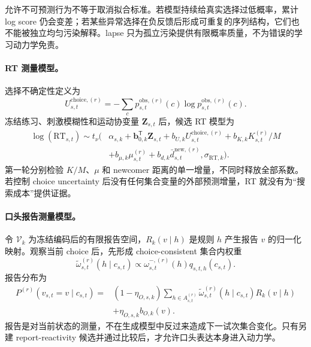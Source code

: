 允许不可预测行为不等于取消拟合标准。若模型持续给真实选择过低概率，累计 log score 仍会变差；若某些异常选择在负反馈后形成可重复的序列结构，它们也不能被独立均匀污染解释。lapse 只为孤立污染提供有限概率质量，不为错误的学习动力学免责。

\paragraph{RT 测量模型。}
选择不确定性定义为
\begin{equation}
    U^{\mathrm{choice},(r)}_{s,t}
    =-\sum_c p^{\mathrm{obs},(r)}_{s,t}(c)
      \log p^{\mathrm{obs},(r)}_{s,t}(c).
\end{equation}
冻结练习、刺激模糊性和运动协变量 $\mathbf Z_{s,t}$ 后，候选 RT 模型为
\begin{align}
    \log(\mathrm{RT}_{s,t})\sim t_\nu\!\Big(&
      \alpha_{s,k}+\mathbf b_{0,k}^{\mathsf T}\mathbf Z_{s,t}
      +b_{U,k}U^{\mathrm{choice},(r)}_{s,t}
      +b_{K,k}K^{(r)}_{s,t}/M\nonumber\\
      &+b_{\mu,k}\mu^{(r)}_{s,t}
      +b_{d,k}\bar d^{\mathrm{new},(r)}_{s,t},
      \sigma_{\mathrm{RT},k}\Big).
    \label{eq:model0805-rt-channel}
\end{align}
第一轮分别检验 $K/M$、$\mu$ 和 newcomer 距离的单一增量，不同时释放全部系数。若控制 choice uncertainty 后没有任何集合变量的外部预测增量，RT 就没有为“搜索成本”提供证据。

\paragraph{口头报告测量模型。}
令 $\mathcal V_k$ 为冻结编码后的有限报告空间，$R_k(v\mid h)$ 是规则 $h$ 产生报告 $v$ 的归一化映射。观察当前 choice 后，先形成 choice-consistent 集合内权重
\begin{equation}
    \widetilde\omega^{(r)}_{s,t}(h\mid c_{s,t})
    \propto\omega^{-,(r)}_{s,t}(h)
      q_{s,t,h}(c_{s,t}).
    \label{eq:model0805-report-weight}
\end{equation}
报告分布为
\begin{align}
    P^{(r)}(v_{s,t}=v\mid c_{s,t})
    =&(1-\eta_{O,s,k})
      \sum_{h\in A^{(r)}_{s,t}}
      \widetilde\omega^{(r)}_{s,t}(h\mid c_{s,t})R_k(v\mid h)\nonumber\\
      &+\eta_{O,s,k}b_{O,k}(v).
    \label{eq:model0805-oral-channel}
\end{align}
报告是对当前状态的测量，不在生成模型中反过来造成下一试次集合变化。只有另建 report-reactivity 候选并通过比较后，才允许口头表达本身进入动力学。

